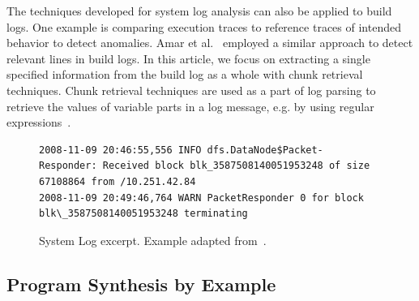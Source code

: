 The techniques developed for system log analysis can also be applied to build logs.
One example is comparing execution traces to reference traces of intended behavior to detect anomalies.
Amar et al.~\cite{amar2019mining} employed a similar approach to detect relevant lines in build logs.
In this article, we focus on extracting a single specified information from the build log as a whole with chunk retrieval techniques.
Chunk retrieval techniques are used as a part of log parsing to retrieve the values of variable parts in a log message, e.g. by using regular expressions~\cite{nagappan2010abstracting,xu2009detecting}.

\begin{figure}[!t]
  \centering
  \begin{lstlisting}[breaklines=true]
2008-11-09 20:46:55,556 INFO dfs.DataNode$Packet- Responder: Received block blk_3587508140051953248 of size 67108864 from /10.251.42.84
2008-11-09 20:49:46,764 WARN PacketResponder 0 for block blk\_3587508140051953248 terminating
  \end{lstlisting}  
  \caption{System Log excerpt. Example adapted from~\cite{he2017towards}.}
  \label{lst:system-log}
\end{figure}

\subsection{Program Synthesis by Example}
\label{sec:rw-prose}

